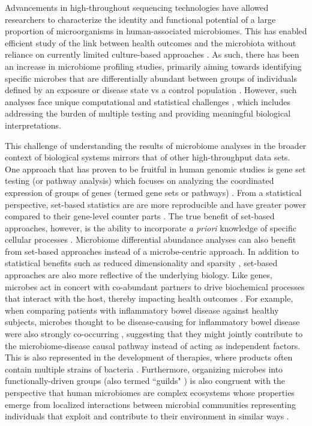 \documentclass{bmcart}
\begin{document}
Advancements in high-throughout sequencing technologies have allowed researchers to characterize the identity and functional potential of a large proportion of microorganisms in human-associated microbiomes. This has enabled efficient study of the link between health outcomes and the microbiota without reliance on currently limited culture-based approaches \cite{lagier2016culture}. As such, there has been an increase in microbiome profiling studies, primarily aiming towards identifying specific microbes that are differentially abundant between groups of individuals defined by an exposure or disease state vs a control population \cite{zhang2019advancing}. However, such analyses face unique computational and statistical challenges \cite{li2019statistical}, which includes addressing the burden of multiple testing and providing meaningful biological interpretations.  

This challenge of understanding the results of microbiome analyses in the broader context of biological systems mirrors that of other high-throughput data sets. One approach that has proven to be fruitful in human genomic studies is gene set testing (or pathway analysis) which focuses on analyzing the coordinated expression of groups of genes (termed gene sets or pathways) \cite{maleki2020gene}. From a statistical perspective, set-based statistics are are more reproducible and have greater power compared to their gene-level counter parts \cite{goeman2007analyzing}. The true benefit of set-based approaches, however, is the ability to incorporate \textit{a priori} knowledge of specific cellular processes \cite{liberzon2015molecular}. Microbiome differential abundance analyses can also benefit from set-based approaches instead of a microbe-centric approach. In addition to statistical benefits such as reduced dimensionality and sparsity \cite{nguyen2022cbea, kou2020microbeset}, set-based approaches are also more reflective of the underlying biology. Like genes, microbes act in concert with co-abundant partners to drive biochemical processes that interact with the host, thereby impacting health outcomes \cite{wu2021guildbased}. For example, when comparing patients with inflammatory bowel disease against healthy subjects, microbes thought to be disease-causing for inflammatory bowel disease were also strongly co-occurring \cite{gevers2014treatmentnaive}, suggesting that they might jointly contribute to the microbiome-disease causal pathway instead of acting as independent factors. This is also represented in the development of therapies, where products often contain multiple strains of bacteria \cite{berg2020microbiome, durack2019gut}. Furthermore, organizing microbes into functionally-driven groups (also termed ``guilds" \cite{wu2021guildbased}) is also congruent with the perspective that human microbiomes are complex ecosystems whose properties emerge from localized interactions between microbial communities representing individuals that exploit and contribute to their environment in similar ways \cite{faust2012microbial}.  
\end{document}
